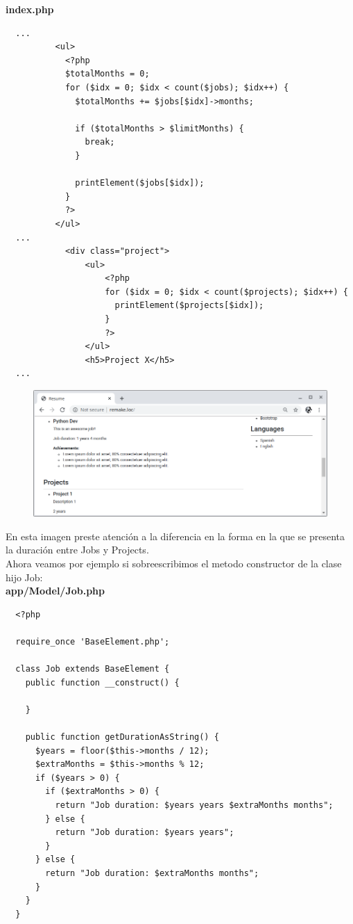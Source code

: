 \documentclass{article}
\begin{document}
\textbf{index.php}
\begin{verbatim}
  ...
          <ul>
            <?php
            $totalMonths = 0;
            for ($idx = 0; $idx < count($jobs); $idx++) {
              $totalMonths += $jobs[$idx]->months;

              if ($totalMonths > $limitMonths) {
                break;
              }

              printElement($jobs[$idx]);
            }
            ?>
          </ul>
  ...
            <div class="project">
                <ul>
                    <?php
                    for ($idx = 0; $idx < count($projects); $idx++) {
                      printElement($projects[$idx]);
                    }
                    ?>
                </ul>
                <h5>Project X</h5>
  ...
\end{verbatim}

\begin{figure}[h!]
  \centering
  \includegraphics[scale=0.5]{./Pictures/045_polimorfismo.png}
\end{figure}

En esta imagen preste atención a la diferencia en la forma en la que se
presenta la duración entre Jobs y Projects.\\

Ahora veamos por ejemplo si sobreescribimos el metodo constructor de la clase hijo
Job:\\

\textbf{app/Model/Job.php}
\begin{verbatim}
  <?php

  require_once 'BaseElement.php';

  class Job extends BaseElement {
    public function __construct() {

    }

    public function getDurationAsString() {
      $years = floor($this->months / 12);
      $extraMonths = $this->months % 12;
      if ($years > 0) {
        if ($extraMonths > 0) {
          return "Job duration: $years years $extraMonths months";
        } else {
          return "Job duration: $years years";
        }
      } else {
        return "Job duration: $extraMonths months";
      }
    }
  }
\end{verbatim}
\end{document}

